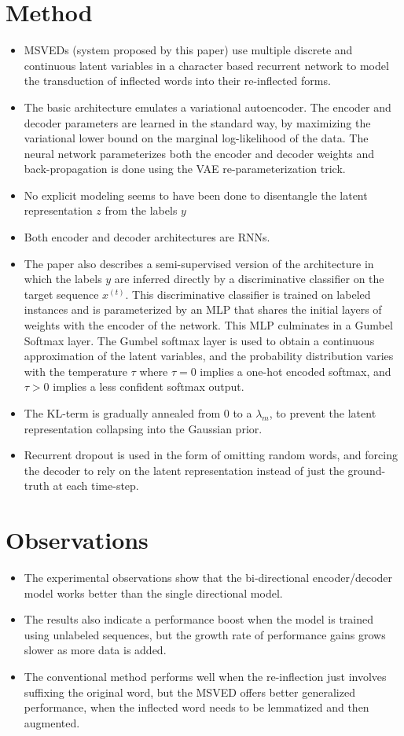 \documentclass[12pt]{article}
\begin{document}
\section{Method}
  \begin{itemize}
    \item MSVEDs (system proposed by this paper) use multiple discrete and continuous latent variables in a character based recurrent network to model the transduction of inflected words into their re-inflected forms.
    \item The basic architecture emulates a variational autoencoder. The encoder and decoder parameters are learned in the standard way, by maximizing the variational lower bound on the marginal log-likelihood of the data. The neural network parameterizes both the encoder and decoder weights and back-propagation is done using the VAE re-parameterization trick.
    \item No explicit modeling seems to have been done to disentangle the latent representation $z$ from the labels $y$
    \item Both encoder and decoder architectures are RNNs.
    \item The paper also describes a semi-supervised version of the architecture in which the labels $y$ are inferred directly by a discriminative classifier on the target sequence $x^{(t)}$. This discriminative classifier is trained on labeled instances and is parameterized by an MLP that shares the initial layers of weights with the encoder of the network. This MLP culminates in a Gumbel Softmax layer. The Gumbel softmax layer is used to obtain a continuous approximation of the latent variables, and the probability distribution varies with the temperature $\tau$ where $\tau = 0$ implies a one-hot encoded softmax, and $\tau > 0$ implies a less confident softmax output.
    \item The KL-term is gradually annealed from 0 to a $\lambda_m$, to prevent the latent representation collapsing into the Gaussian prior.
    \item Recurrent dropout is used in the form of omitting random words, and forcing the decoder to rely on the latent representation instead of just the ground-truth at each time-step.        
  \end{itemize}

\section{Observations}
  \begin{itemize}
    \item The experimental observations show that the bi-directional encoder/decoder model works better than the single directional model.
    \item The results also indicate a performance boost when the model is trained using unlabeled sequences, but the growth rate of performance gains grows slower as more data is added.
    \item The conventional method performs well when the re-inflection just involves suffixing the original word, but the MSVED offers better generalized performance, when the inflected word needs to be lemmatized and then augmented.
  \end{itemize}
\end{document}
